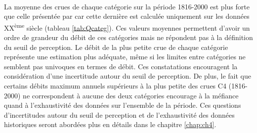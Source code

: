 	\paragraph{} La moyenne des crues de chaque catégorie sur la période 1816-2000 est plus forte que celle présentée par \citet{pichard_hydro-climatology_2017} car cette dernière est calculée uniquement sur les données XX\textsuperscript{ème} siècle (tableau \ref{tab:Qcateg}). Ces valeurs moyennes permettent d'avoir un ordre de grandeur du débit de ces catégories mais ne répondent pas à la définition du seuil de perception. Le débit de la plus petite crue de chaque catégorie représente une estimation plus adéquate, même si les limites entre catégories ne semblent pas univoques en termes de débit. Ces constatations encouragent la considération d'une incertitude autour du seuil de perception. De plus, le fait que certains débits maximum annuels supérieurs à la plus petite des crues C4 (1816-2000) ne correspondent à aucune des deux catégories encourage à la méfiance quand à l'exhaustivité des données sur l'ensemble de la période. Ces questions d'incertitudes autour du seuil de perception et de l'exhaustivité des données historiques seront abordées plus en détails dans le chapitre \ref{chap:ch4}.

	\begin{table}[h]
	\centering
	\caption{Débits caractéristiques des catégories de la base HISTRHÔNE. Les estimations de \citet{pichard_hydro-climatology_2017} représentent la moyenne des débits maximum annuels du XX\textsuperscript{ème} siècle. Les autres colonnes correspondent à la moyenne des débits maximum annuels de chaque catégorie et le débit de la crue la plus petite de chacune des catégories basés sur la chronique continue (i.e. sans interruption) estimée de 1816 à 2000 au chapitre \ref{chap:ch3}.} 
	\label{tab:Qcateg}
	\end{table}
	
